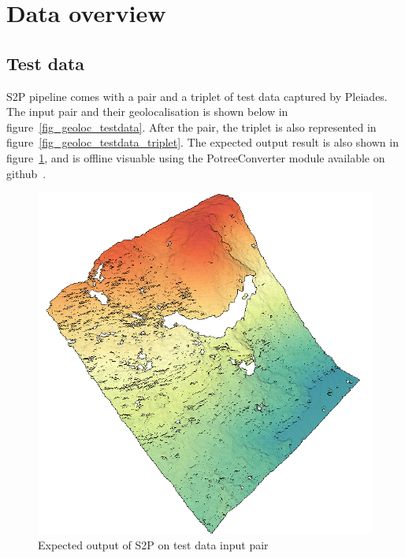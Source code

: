 \documentclass[paper=a4, fontsize=11pt, onecolumn, tikz, dvipsnames, svgnames, x11names]{article}
\begin{document}
\section{Data overview}

\subsection{Test data}

S2P pipeline comes with a pair and a triplet of test data captured by Pleiades. The input pair and their geolocalisation is shown below in figure~\ref{fig_geoloc_testdata}. After the pair, the triplet is also represented in figure~\ref{fig_geoloc_testdata_triplet}. The expected output result is also shown in figure~\ref{fig_expected_output_pair}, and is offline visuable using the PotreeConverter module available on github~\cite{PotreeConverter}.

\begin{figure}[H]
    \centering
    \includegraphics[height = 0.4\textheight]{elevation_intro.png}
    \caption{Expected output of S2P on test data input pair}
    \label{fig_expected_output_pair}
\end{figure}
\end{document}
